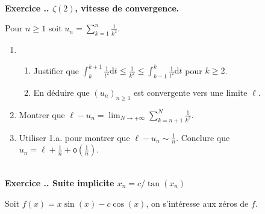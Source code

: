 \documentclass{article}
\newcommand{\di}{\mathrm{d}}
\newcounter{exo}
\newcommand{\exercice}[1][\null]{\textbf{\\ Exercice \thesection.\theexo. #1} \addtocounter{exo}{1}}
\begin{document}
\exercice[$\zeta(2)$, vitesse de convergence.]

Pour $n \ge 1$ soit $u_n = \sum_{k=1}^n \frac{1}{k^2}$.

\begin{enumerate}

\item \begin{enumerate}

\item Justifier que $\displaystyle \int_{k}^{k+1} \frac{1}{t^2} \di t \le \frac{1}{k^2} \le \displaystyle \int_{k-1}^{k}  \frac{1}{t^2} \di t$ pour $k \ge 2$.

\item En déduire que $(u_n)_{n \ge 1}$ est convergente vers une limite $\ell$.
\end{enumerate}

\item Montrer que $\displaystyle \ell - u_n = \lim_{N \rightarrow + \infty} \sum_{k=n+1}^N \frac{1}{k^2}$.

\item Utiliser 1.a. pour montrer que $\ell - u_n\sim \frac{1}{n}$. Conclure que $u_n = \ell + \frac{1}{n} + \mathsf{o}\left(\frac{1}{n} \right)$.

\end{enumerate}

\exercice[Suite implicite $x_n = c / \tan(x_n)$]

Soit $f(x) = x \sin(x) - c \cos(x)$, on s'intéresse aux zéros de $f$.
\end{document}
